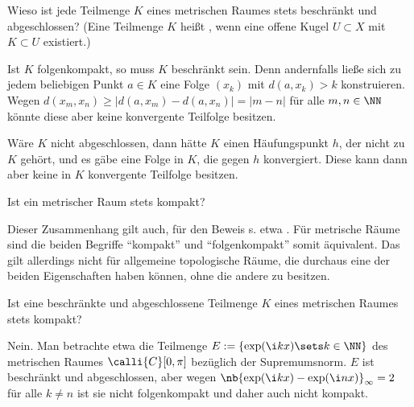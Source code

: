 \begin{frage}\label{09_beschrabgeschlossen}
  Wieso ist jede  Teilmenge $K$ eines metrischen 
  Raumes stets beschränkt und abgeschlossen? (Eine Teilmenge 
  $K$ heißt , wenn eine offene Kugel $U \subset X$ mit 
  $K \subset U$ existiert.) 
\end{frage}

\begin{antwort}
  Ist $K$ folgenkompakt, so muss $K$ beschränkt sein. 
  Denn andernfalls ließe sich zu jedem beliebigen Punkt $a\in K$ eine 
  Folge $(x_k)$ mit $d(a,x_k)>k$ konstruieren. Wegen 
  $d(x_m,x_n) \ge | d(a,x_m) - d(a,x_n )| = |m-n|$ für alle 
  $m,n\in \NN$ könnte diese aber keine konvergente Teilfolge besitzen.  

  Wäre $K$ nicht abgeschlossen, dann hätte $K$ einen 
  Häufungspunkt $h$, der nicht zu $K$ gehört, 
  und es gäbe eine Folge in $K$, die gegen $h$ konvergiert. 
  Diese kann dann aber keine in $K$ konvergente Teilfolge besitzen.
  \AntEnd
\end{antwort}

\begin{frage}
  Ist ein  metrischer Raum stets kompakt?
\end{frage}

\begin{antwort}
  Dieser Zusammenhang gilt auch, für den Beweis s. etwa \citep{JaenichTop}. 
  Für metrische Räume sind die beiden Begriffe "`kompakt"' und 
  "`folgenkompakt"' somit äquivalent. Das gilt allerdings nicht 
  für allgemeine topologische Räume, die durchaus eine der beiden 
  Eigenschaften haben können, ohne die andere zu besitzen. 
  \AntEnd
\end{antwort}

\begin{frage}\label{09_abesch}
  Ist eine beschränkte und abgeschlossene Teilmenge $K$ eines 
  metrischen Raumes stets kompakt?
\end{frage}

\begin{antwort}
  Nein. Man betrachte etwa die Teilmenge   
  $E := \{ \exp(\i kx)\sets k \in \NN\}$ des metrischen Raumes 
  $\calli{C}[0,\pi]$ bezüglich der Supremumsnorm. 
  $E$ ist beschränkt und abgeschlossen, aber wegen 
  $\nb{\exp(\i kx)-\exp(\i n x) }_\infty = 2$ für alle $k\not=n$ ist 
  sie nicht folgenkompakt und daher auch nicht kompakt.
  \AntEnd
\end{antwort}


